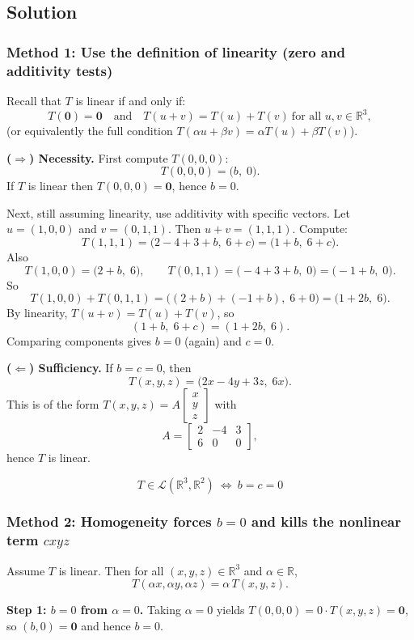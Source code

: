 \documentclass[12pt]{article}
\newcommand{\R}{\mathbb{R}}
\newcommand{\cL}{\mathcal{L}}
\begin{document}
\subsection{Solution}

\subsubsection{Method 1: Use the definition of linearity (zero and additivity tests)}
Recall that $T$ is linear if and only if:
\[
T(\bm{0})=\bm{0}\quad\text{and}\quad T(u+v)=T(u)+T(v)\ \text{for all }u,v\in\R^3,
\]
(or equivalently the full condition $T(\alpha u+\beta v)=\alpha T(u)+\beta T(v)$).

\medskip
\noindent\textbf{($\Rightarrow$) Necessity.}
First compute $T(0,0,0)$:
\[
T(0,0,0)=\bigl(b,\;0\bigr).
\]
If $T$ is linear then $T(0,0,0)=\bm{0}$, hence $b=0$.

Next, still assuming linearity, use additivity with specific vectors.
Let $u=(1,0,0)$ and $v=(0,1,1)$. Then $u+v=(1,1,1)$. Compute:
\[
T(1,1,1)=\bigl(2-4+3+b,\;6 + c\bigr)=\bigl(1+b,\;6+c\bigr).
\]
Also
\[
T(1,0,0)=\bigl(2+b,\;6\bigr),\qquad
T(0,1,1)=\bigl(-4+3+b,\;0\bigr)=\bigl(-1+b,\;0\bigr).
\]
So
\[
T(1,0,0)+T(0,1,1)=\bigl((2+b)+(-1+b),\;6+0\bigr)=\bigl(1+2b,\;6\bigr).
\]
By linearity, $T(u+v)=T(u)+T(v)$, so
\[
(1+b,\;6+c)=(1+2b,\;6).
\]
Comparing components gives $b=0$ (again) and $c=0$.

\medskip
\noindent\textbf{($\Leftarrow$) Sufficiency.}
If $b=c=0$, then
\[
T(x,y,z)=\bigl(2x-4y+3z,\;6x\bigr).
\]
This is of the form $T(x,y,z)=A\begin{bmatrix}x\\y\\z\end{bmatrix}$ with
\[
A=\begin{bmatrix}
2 & -4 & 3\\
6 & 0 & 0
\end{bmatrix},
\]
hence $T$ is linear.

\[
\boxed{\,T\in\cL(\R^3,\R^2)\ \Longleftrightarrow\ b=c=0\,}
\]

\subsubsection{Method 2: Homogeneity forces $b=0$ and kills the nonlinear term $cxyz$}
Assume $T$ is linear. Then for all $(x,y,z)\in\R^3$ and $\alpha\in\R$,
\[
T(\alpha x,\alpha y,\alpha z)=\alpha\,T(x,y,z).
\]

\medskip
\noindent\textbf{Step 1: $b=0$ from $\alpha=0$.}
Taking $\alpha=0$ yields $T(0,0,0)=0\cdot T(x,y,z)=\bm{0}$, so $(b,0)=\bm{0}$ and hence $b=0$.
\end{document}
